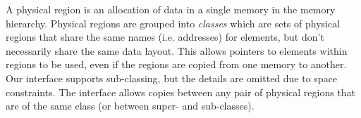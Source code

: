 A physical region is an allocation of data in a single memory in the memory hierarchy.  Physical
regions are grouped into {\em classes} which are sets of physical regions that share the
same names (i.e. addresses) for elements, but don't necessarily share the same data layout.  This
allows pointers to elements within regions to be used, even if the regions are copied from one memory
to another.  Our
interface supports sub-classing, but the details are omitted due to space constraints.  The
interface allows copies between any pair of physical regions that are of
the same class (or between super- and sub-classes).  



